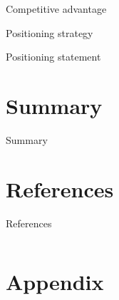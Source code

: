 \documentclass[aspectratio=169]{beamer}
\begin{document}
\begin{frame}{Competitive advantage}

\end{frame}

\begin{frame}{Positioning strategy}

\end{frame}

\begin{frame}{Positioning statement}

\end{frame}





\section{Summary}

\begin{frame}{Summary}

\end{frame}


\section{References}
\begin{frame}{References}
   \begin{columns}
      \begin{column}{0.9\textwidth}

         \printbibliography[heading=none]
      \end{column}
   \end{columns}

\end{frame}


\section*{Appendix}
\end{document}
